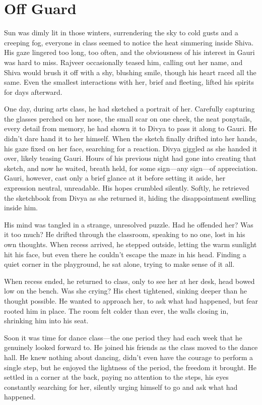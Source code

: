 \chapter{Off Guard}
Sun was dimly lit in those winters, surrendering the sky to cold gusts and a creeping fog, everyone in class seemed to notice the heat simmering inside Shiva. His gaze lingered too long, too often, and the obviousness of his interest in Gauri was hard to miss. Rajveer occasionally teased him, calling out her name, and Shiva would brush it off with a shy, blushing smile, though his heart raced all the same. Even the smallest interactions with her, brief and fleeting, lifted his spirits for days afterward.

One day, during arts class, he had sketched a portrait of her. Carefully capturing the glasses perched on her nose, the small scar on one cheek, the neat ponytails, every detail from memory, he had shown it to Divya to pass it along to Gauri. He didn't dare hand it to her himself. When the sketch finally drifted into her hands, his gaze fixed on her face, searching for a reaction. Divya giggled as she handed it over, likely teasing Gauri. Hours of his previous night had gone into creating that sketch, and now he waited, breath held, for some sign—any sign—of appreciation. Gauri, however, cast only a brief glance at it before setting it aside, her expression neutral, unreadable. His hopes crumbled silently. Softly, he retrieved the sketchbook from Divya as she returned it, hiding the disappointment swelling inside him.

His mind was tangled in a strange, unresolved puzzle. Had he offended her? Was it too much? He drifted through the classroom, speaking to no one, lost in his own thoughts. When recess arrived, he stepped outside, letting the warm sunlight hit his face, but even there he couldn't escape the maze in his head. Finding a quiet corner in the playground, he sat alone, trying to make sense of it all.

When recess ended, he returned to class, only to see her at her desk, head bowed low on the bench. Was she crying? His chest tightened, sinking deeper than he thought possible. He wanted to approach her, to ask what had happened, but fear rooted him in place. The room felt colder than ever, the walls closing in, shrinking him into his seat.

Soon it was time for dance class—the one period they had each week that he genuinely looked forward to. He joined his friends as the class moved to the dance hall. He knew nothing about dancing, didn't even have the courage to perform a single step, but he enjoyed the lightness of the period, the freedom it brought. He settled in a corner at the back, paying no attention to the steps, his eyes constantly searching for her, silently urging himself to go and ask what had happened.

